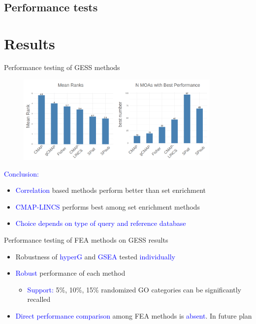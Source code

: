 \documentclass[10pt]{beamer}
\begin{document}
\subsection{Performance tests}
\section{Results}
\begin{frame}{Performance testing of GESS methods}
\vspace{-0.25cm}
    \begin{figure}
        \includegraphics[width=10cm]{demo/images/gess_test.png}
    \end{figure}
    \vspace{-0.6cm}
    \textcolor{blue}{Conclusion:}\\
    \begin{itemize}
        \item \textcolor{blue}{Correlation} based methods perform better than set enrichment
        \item \textcolor{blue}{CMAP-LINCS} performs best among set enrichment methods
        \item \textcolor{blue}{Choice depends on type of query and reference database}
    \end{itemize}
\end{frame}
\begin{frame}{Performance testing of FEA methods on GESS results}
\vspace{-3cm}
    \begin{itemize}
        \item Robustness of \textcolor{blue}{hyperG} and \textcolor{blue}{GSEA} tested \textcolor{blue}{individually}
        \item \textcolor{blue}{Robust} performance of each method
            \begin{itemize}
                \item \textcolor{blue}{Support:} 5\%, 10\%, 15\% randomized GO categories can be significantly recalled
            \end{itemize}
        \item \textcolor{blue}{Direct performance comparison} among FEA methods is \textcolor{blue}{absent}. In future plan
    \end{itemize}
\end{frame}
\end{document}
